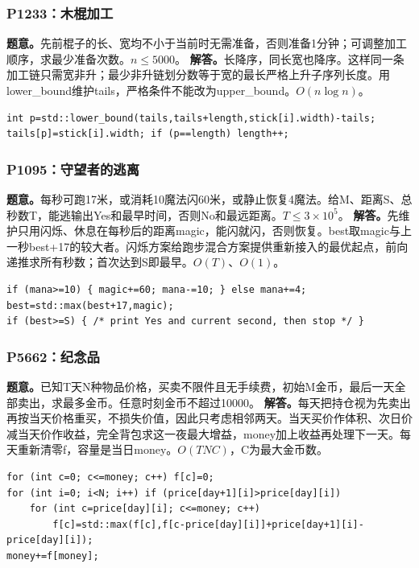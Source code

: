 \subsubsection{P1233：木棍加工}
\textbf{题意。}先前棍子的长、宽均不小于当前时无需准备，否则准备1分钟；可调整加工顺序，求最少准备次数。$n\le5000$。
\textbf{解答。}长降序，同长宽也降序。这样同一条加工链只需宽非升；最少非升链划分数等于宽的最长严格上升子序列长度。用lower\_bound维护tails，严格条件不能改为upper\_bound。$O(n\log n)$。
\begin{lstlisting}
int p=std::lower_bound(tails,tails+length,stick[i].width)-tails;
tails[p]=stick[i].width; if (p==length) length++;
\end{lstlisting}

\subsubsection{P1095：守望者的逃离}
\textbf{题意。}每秒可跑17米，或消耗10魔法闪60米，或静止恢复4魔法。给M、距离S、总秒数T，能逃输出Yes和最早时间，否则No和最远距离。$T\le3\times10^5$。
\textbf{解答。}先维护只用闪烁、休息在每秒后的距离magic，能闪就闪，否则恢复。best取magic与上一秒best+17的较大者。闪烁方案给跑步混合方案提供重新接入的最优起点，前向递推求所有秒数；首次达到S即最早。$O(T)$、$O(1)$。
\begin{lstlisting}
if (mana>=10) { magic+=60; mana-=10; } else mana+=4;
best=std::max(best+17,magic);
if (best>=S) { /* print Yes and current second, then stop */ }
\end{lstlisting}

\subsubsection{P5662：纪念品}
\textbf{题意。}已知T天N种物品价格，买卖不限件且无手续费，初始M金币，最后一天全部卖出，求最多金币。任意时刻金币不超过10000。
\textbf{解答。}每天把持仓视为先卖出再按当天价格重买，不损失价值，因此只考虑相邻两天。当天买价作体积、次日价减当天价作收益，完全背包求这一夜最大增益，money加上收益再处理下一天。每天重新清零f，容量是当日money。$O(TNC)$，C为最大金币数。
\begin{lstlisting}
for (int c=0; c<=money; c++) f[c]=0;
for (int i=0; i<N; i++) if (price[day+1][i]>price[day][i])
    for (int c=price[day][i]; c<=money; c++)
        f[c]=std::max(f[c],f[c-price[day][i]]+price[day+1][i]-price[day][i]);
money+=f[money];
\end{lstlisting}

